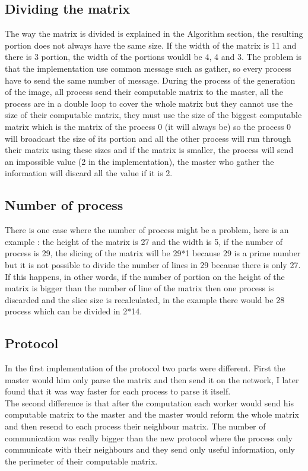 \documentclass[a4paper,12pt]{article}
\begin{document}
\subsection{Dividing the matrix}
The way the matrix is divided is explained in the Algorithm section, the resulting portion does not always have the same size. If the width of the matrix is 11 and there is 3 portion, the width of the portions wouldl be 4, 4 and 3. The problem is that the implementation use common message such as gather, so every process have to send the same number of message. During the process of the generation of the image, all process send their computable matrix to the master, all the process are in a double loop to cover the whole matrix but they cannot use the size of their computable matrix, they must use the size of the biggest computable matrix which is the matrix of the process 0 (it will always be) so the process 0 will broadcast the size of its portion and all the other process will run through their matrix using these sizes and if the  matrix is smaller, the process will send an impossible value (2 in the implementation), the master who gather the information will discard all the value if it is 2.
\subsection{Number of process}
There is one case where the number of process might be a problem, here is an example : the height of the matrix is 27 and the width is 5, if the number of process is 29, the slicing of the matrix will be 29*1 because 29 is a prime number but it is not possible to divide the number of lines in 29 because there is only 27. If this happens, in other words, if the number of portion on the height of the matrix is bigger than the number of line of the matrix then one process is discarded and the slice size is recalculated, in the example there would be 28 process which can be divided in 2*14.
\subsection{Protocol}
In the first implementation of the protocol two parts were different. First the master would him only parse the matrix and then send it on the network, I later found that it was way faster for each process to parse it itself.\\
The second difference is that after the computation each worker would send his computable matrix to the master and the master would reform the whole matrix and then resend to each process their neighbour matrix. The number of communication was really bigger than the new protocol where the process only communicate with their neighbours and they send only useful information, only the perimeter of their computable matrix.
\end{document}
